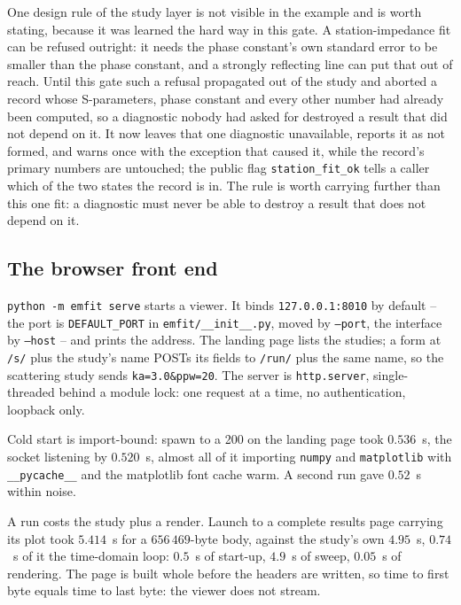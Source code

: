 One design rule of the study layer is not visible in the example and is worth stating, because it was learned
the hard way in this gate. A station-impedance fit can be refused outright: it needs the phase constant's own
standard error to be smaller than the phase constant, and a strongly reflecting line can put that out of reach.
Until this gate such a refusal propagated out of the study and aborted a record whose S-parameters, phase
constant and every other number had already been computed, so a diagnostic nobody had asked for destroyed a
result that did not depend on it. It now leaves that one diagnostic unavailable, reports it as not formed, and
warns once with the exception that caused it, while the record's primary numbers are untouched; the public flag
\texttt{station\_fit\_ok} tells a caller which of the two states the record is in. The rule is worth carrying
further than this one fit: a diagnostic must never be able to destroy a result that does not depend on it.

\subsection{The browser front end}
\label{sec:webapp}

\texttt{python -m emfit serve} starts a viewer. It binds \texttt{127.0.0.1:8010} by default -- the port is
\texttt{DEFAULT\_PORT} in \texttt{emfit/\_\_init\_\_.py}, moved by \texttt{--port}, the interface by \texttt{--host}
-- and prints the address. The landing page lists the studies; a form at \texttt{/s/} plus the study's name POSTs its
fields to \texttt{/run/} plus the same name, so the scattering study sends \texttt{ka=3.0\&ppw=20}. The server is
\texttt{http.server}, single-threaded behind a module lock: one request at a time, no authentication, loopback only.

Cold start is import-bound: spawn to a 200 on the landing page took $0.536$~s, the socket listening by $0.520$~s,
almost all of it importing \texttt{numpy} and \texttt{matplotlib} with \texttt{\_\_pycache\_\_} and the matplotlib
font cache warm. A second run gave $0.52$~s within noise.

A run costs the study plus a render. Launch to a complete results page carrying its plot took $5.414$~s for a
$656\,469$-byte body, against the study's own $4.95$~s, $0.74$~s of it the time-domain loop: $0.5$~s of start-up,
$4.9$~s of sweep, $0.05$~s of rendering. The page is built whole before the headers are written, so time to first byte
equals time to last byte: the viewer does not stream.

